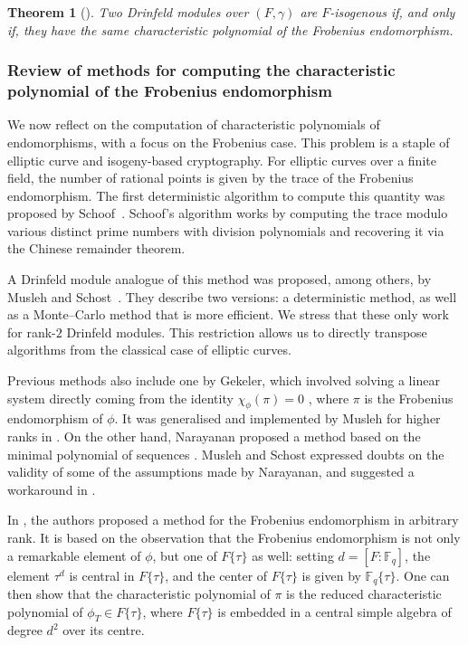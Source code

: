 \documentclass[11pt]{article}
\newtheorem{theorem}{Theorem}[section]
\theoremstyle{definition}
\newcommand\Fq{\mathbb{F}_q}
\begin{document}
\begin{theorem}[{\cite[Theorem~4.3.2]{Pap23}}]
\label{th:isogenous-charpoly}
  Two Drinfeld modules over $(F, \gamma)$ are $F$-isogenous if, and only if, they
  have the same characteristic polynomial of the Frobenius endomorphism.
\end{theorem}

\subsubsection{Review of methods for computing the characteristic polynomial of
the Frobenius endomorphism}
\label{sec:review-frobenius-charpoly}

We now reflect on the computation of characteristic polynomials of
endomorphisms, with a focus on the Frobenius case. This problem is a staple of elliptic
curve and isogeny-based cryptography. For elliptic curves over a finite field,
the number of rational points is given by the trace of the Frobenius
endomorphism. The first deterministic algorithm to compute this
quantity was proposed by Schoof~\cite{schoof_elliptic_1985}. Schoof's algorithm works by computing
the trace modulo various distinct prime numbers with division polynomials and
recovering it via the Chinese remainder theorem.

A Drinfeld module analogue of this method was proposed, among others, by Musleh
and Schost~\cite{musleh_computing_2019, musleh_fast_2018, musleh_algorithms_2023}. They describe two versions: a deterministic method, as well as a Monte--Carlo method
that is more efficient. We stress that these only work for rank-$2$ Drinfeld
modules. This restriction allows us to directly transpose algorithms from the
classical case of elliptic curves.

Previous methods also include one by Gekeler, which involved solving a linear
system directly coming from the identity $\chi_\phi(\pi) = 0$
\cite{gekeler_frobenius_2008}, where $\pi$ is the Frobenius endomorphism of $\phi$. It was generalised and implemented by Musleh for
higher ranks in \cite[\S~4.4.1]{musleh_algorithms_2023}. On the other hand,
Narayanan proposed a method based on the minimal polynomial of sequences
\cite{narayanan_polynomial_2018}. Musleh and Schost expressed doubts on the
validity of some of the assumptions made by Narayanan, and suggested a
workaround in \cite[\S~5]{musleh_computing_2019}.

In \cite[\S~4]{CL23}, the authors proposed a method for the Frobenius
endomorphism in arbitrary rank. It is based on the observation
that the Frobenius
endomorphism is not only a remarkable element of $\phi$, but one of
$F\{\tau\}$ as well: setting $d = [F: \Fq]$, the element $\tau^d$ is central in $F\{\tau\}$, and
the center of $F\{\tau\}$ is given by $\Fq\{\tau\}$. One can then show that the
characteristic polynomial of $\pi$ is the reduced characteristic polynomial of
$\phi_T \in F\{\tau\}$, where $F\{\tau\}$ is embedded in a central simple algebra
of degree $d^2$ over its centre.
\end{document}
